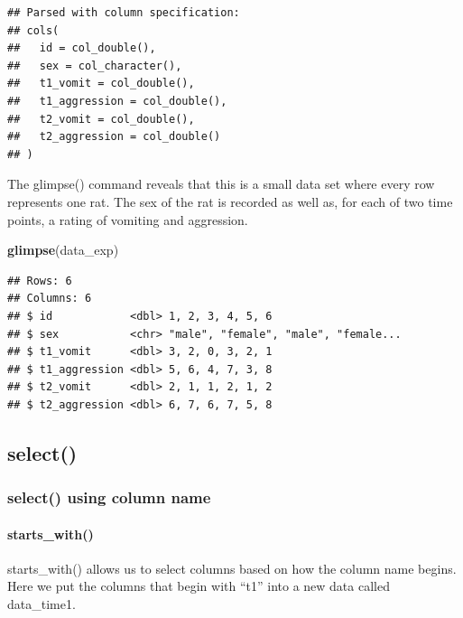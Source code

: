 \documentclass[
]{krantz}
\makeatletter
\newenvironment{Shaded}{\begin{snugshade}}{\end{snugshade}}
\newcommand{\KeywordTok}[1]{\textcolor[rgb]{0.27,0.27,0.27}{\textbf{#1}}}
\newcommand{\NormalTok}[1]{#1}
\newcommand{\OperatorTok}[1]{\textcolor[rgb]{0.43,0.43,0.43}{\textbf{#1}}}
\newcommand{\StringTok}[1]{\textcolor[rgb]{0.5,0.5,0.5}{#1}}
\newenvironment{kframe}{%
\medskip{}
\setlength{\fboxsep}{.8em}
 \def\at@end@of@kframe{}%
 \ifinner\ifhmode%
  \def\at@end@of@kframe{\end{minipage}}%
  \begin{minipage}{\columnwidth}%
 \fi\fi%
 \def\FrameCommand##1{\hskip\@totalleftmargin \hskip-\fboxsep
 \colorbox{shadecolor}{##1}\hskip-\fboxsep
     \hskip-\linewidth \hskip-\@totalleftmargin \hskip\columnwidth}%
 \MakeFramed {\advance\hsize-\width
   \@totalleftmargin\z@ \linewidth\hsize
   \@setminipage}}%
 {\par\unskip\endMakeFramed%
 \at@end@of@kframe}
\renewenvironment{Shaded}{\begin{kframe}}{\end{kframe}}
\makeatother
\begin{document}
\begin{verbatim}
## Parsed with column specification:
## cols(
##   id = col_double(),
##   sex = col_character(),
##   t1_vomit = col_double(),
##   t1_aggression = col_double(),
##   t2_vomit = col_double(),
##   t2_aggression = col_double()
## )
\end{verbatim}

The glimpse() command reveals that this is a small data set where every row represents one rat. The sex of the rat is recorded as well as, for each of two time points, a rating of vomiting and aggression.

\begin{Shaded}
\begin{Highlighting}[]
\KeywordTok{glimpse}\NormalTok{(data_exp)}
\end{Highlighting}
\end{Shaded}

\begin{verbatim}
## Rows: 6
## Columns: 6
## $ id            <dbl> 1, 2, 3, 4, 5, 6
## $ sex           <chr> "male", "female", "male", "female...
## $ t1_vomit      <dbl> 3, 2, 0, 3, 2, 1
## $ t1_aggression <dbl> 5, 6, 4, 7, 3, 8
## $ t2_vomit      <dbl> 2, 1, 1, 2, 1, 2
## $ t2_aggression <dbl> 6, 7, 6, 7, 5, 8
\end{verbatim}

\hypertarget{select-1}{%
\subsection{select()}\label{select-1}}

\hypertarget{select-using-column-name}{%
\subsubsection{select() using column name}\label{select-using-column-name}}

\hypertarget{starts_with}{%
\paragraph{starts\_with()}\label{starts_with}}

starts\_with() allows us to select columns based on how the column name begins. Here we put the columns that begin with ``t1'' into a new data called data\_time1.

\begin{Shaded}
\end{Shaded}
\end{document}
